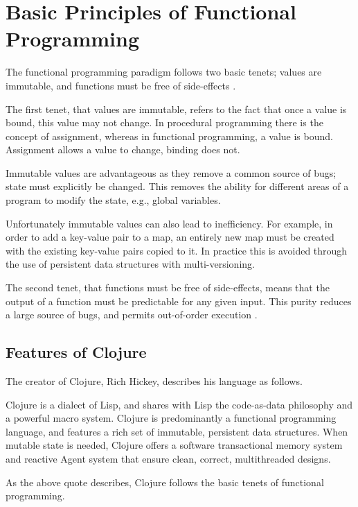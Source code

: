 \section{Basic Principles of Functional Programming}
\label{sec:basic-principles-fp}
	The functional programming paradigm follows two basic tenets; values are immutable, and functions must be free of side-effects \cite{fp-89}.
	
	The first tenet, that values are immutable, refers to the fact that once a value is bound, this value may not change.  In procedural programming there is the concept of assignment, whereas in functional programming, a value is bound.  Assignment allows a value to change, binding does not.
	
	Immutable values are advantageous as they remove a common source of bugs; state must explicitly be changed.  This removes the ability for different areas of a program to modify the state, e.g., global variables.
	
	Unfortunately immutable values can also lead to inefficiency.  For example, in order to add a key-value pair to a map, an entirely new map must be created with the existing key-value pairs copied to it.  In practice this is avoided through the use of persistent data structures with multi-versioning.
	
	The second tenet, that functions must be free of side-effects, means that the output of a function must be predictable for any given input.  This purity reduces a large source of bugs, and permits out-of-order execution \cite{fp-89}.

	\subsection{Features of Clojure}
	\label{sec:features-of-clojure}
		The creator of Clojure, Rich Hickey, describes his language as follows.
		
		\begin{displayquote}
			Clojure is a dialect of Lisp, and shares with Lisp the code-as-data philosophy and a powerful macro system.  Clojure is predominantly a functional programming language, and features a rich set of immutable, persistent data structures.  When mutable state is needed, Clojure offers a software transactional memory system and reactive Agent system that ensure clean, correct, multithreaded designs.
		\end{displayquote}
		
		As the above quote describes, Clojure follows the basic tenets of functional programming.
		
